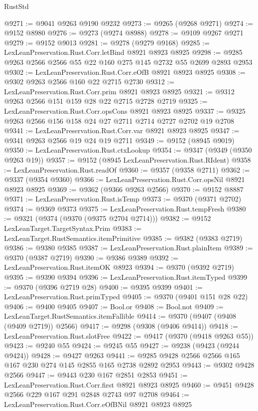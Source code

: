 \begin{lexlean}{RustStd}
\begin{coremodule}
@9271 := @9041 @9263 @9190 @9232
@9273 := @9265 (@9268 @9271)
@9274 := @9152 @8980
@9276 := @9273 (@9274 @8988)
@9278 := @9109 @9267 @9271
@9279 := @9152 @9013
@9281 := @9278 (@9279 @9168)
@9285 := LexLeanPreservation.Rust.Corr.letBind @8921 @8923 @8925
@9298 := @9285 @9263 @2566 @2566 @55 @22 @160 @275 @145 @2732 @55 @2699 @2893 @2953
@9302 := LexLeanPreservation.Rust.Corr.eOfB @8921 @8923 @8925
@9308 := @9302 @9263 @2566 @160 @22 @2715 @2730
@9312 := LexLeanPreservation.Rust.Corr.prim @8921 @8923 @8925
@9321 := @9312 @9263 @2566 @151 @159 @28 @22 @2715 @2728 @2719
@9325 := LexLeanPreservation.Rust.Corr.opsCons @8921 @8923 @8925
@9337 := @9325 @9263 @2566 @156 @158 @24 @27 @2711 @2714 @2727 @2702 @19 @2708
@9341 := LexLeanPreservation.Rust.Corr.var @8921 @8923 @8925
@9347 := @9341 @9263 @2566 @19 @24 @19 @2711
@9349 := @9152 (@8945 @9019)
@9350 := LexLeanPreservation.Rust.ctxLookup
@9354 := @9347 (@9349 (@9350 @9263 @19))
@9357 := @9152 (@8945 LexLeanPreservation.Rust.RIdent)
@9358 := LexLeanPreservation.Rust.readOf
@9360 := @9357 (@9358 @2711)
@9362 := @9337 (@9354 @9360)
@9366 := LexLeanPreservation.Rust.Corr.opsNil @8921 @8923 @8925
@9369 := @9362 (@9366 @9263 @2566)
@9370 := @9152 @8887
@9371 := LexLeanPreservation.Rust.isTemp
@9373 := @9370 (@9371 @2702)
@9374 := @9369 @9373
@9375 := LexLeanPreservation.Rust.tempFresh
@9380 := @9321 (@9374 (@9370 (@9375 @2704 @2714)))
@9382 := @9152 LexLeanTarget.TargetSyntax.Prim
@9383 := LexLeanTarget.RustSemantics.itemPrimitive
@9385 := @9382 (@9383 @2719)
@9386 := @9380 @9385
@9387 := LexLeanPreservation.Rust.plainItem
@9389 := @9370 (@9387 @2719)
@9390 := @9386 @9389
@9392 := LexLeanPreservation.Rust.itemOK @8923
@9394 := @9370 (@9392 @2719)
@9395 := @9390 @9394
@9396 := LexLeanPreservation.Rust.itemTyped
@9399 := @9370 (@9396 @2719 @28)
@9400 := @9395 @9399
@9401 := LexLeanPreservation.Rust.primTyped
@9405 := @9370 (@9401 @151 @28 @22)
@9406 := @9400 @9405
@9407 := Bool.or
@9408 := Bool.not
@9409 := LexLeanTarget.RustSemantics.itemFallible
@9414 := @9370 (@9407 (@9408 (@9409 @2719)) @2566)
@9417 := @9298 (@9308 (@9406 @9414))
@9418 := LexLeanPreservation.Rust.slotFree
@9422 := @9417 (@9370 (@9418 @9263 @55))
@9423 := @9240 @55
@9424 := @9245 @55
@9427 := @9238 (@9423 (@9244 @9424))
@9428 := @9427 @9263
@9441 := @9285 @9428 @2566 @2566 @165 @167 @230 @274 @145 @2855 @165 @2738 @2892 @2953
@9443 := @9302 @9428 @2566
@9447 := @9443 @230 @167 @2851 @2853
@9451 := LexLeanPreservation.Rust.Corr.first @8921 @8923 @8925
@9460 := @9451 @9428 @2566 @229 @167 @291 @2848 @2743 @97 @2708
@9464 := LexLeanPreservation.Rust.Corr.eOfBNil @8921 @8923 @8925

\end{coremodule}
\end{lexlean}
